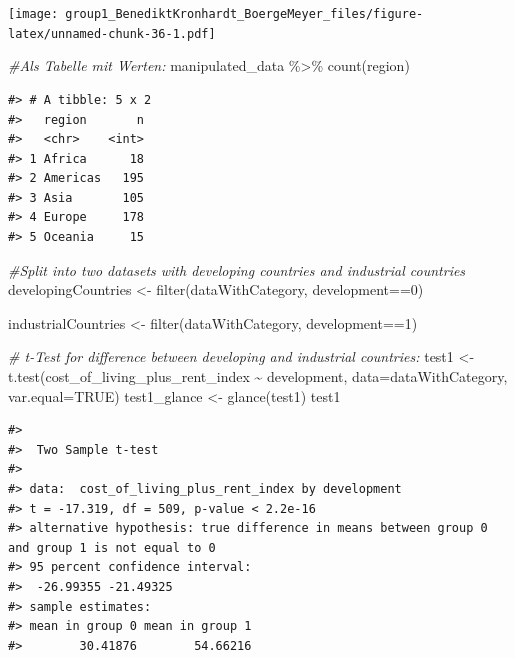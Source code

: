 \documentclass[
  11pt,
  a4paper,
  twoside]{scrbook}
\newenvironment{Shaded}{\begin{snugshade}}{\end{snugshade}}
\newcommand{\AttributeTok}[1]{\textcolor[rgb]{0.77,0.63,0.00}{#1}}
\newcommand{\CommentTok}[1]{\textcolor[rgb]{0.56,0.35,0.01}{\textit{#1}}}
\newcommand{\ConstantTok}[1]{\textcolor[rgb]{0.00,0.00,0.00}{#1}}
\newcommand{\DecValTok}[1]{\textcolor[rgb]{0.00,0.00,0.81}{#1}}
\newcommand{\FunctionTok}[1]{\textcolor[rgb]{0.00,0.00,0.00}{#1}}
\newcommand{\NormalTok}[1]{#1}
\newcommand{\OtherTok}[1]{\textcolor[rgb]{0.56,0.35,0.01}{#1}}
\newcommand{\SpecialCharTok}[1]{\textcolor[rgb]{0.00,0.00,0.00}{#1}}
\begin{document}
\linespread{1}\texttt{[image: group1\_BenediktKronhardt\_BoergeMeyer\_files/figure-latex/unnamed-chunk-36-1.pdf]} \linespread{1}

\begin{Shaded}
\begin{Highlighting}[]

\CommentTok{\#Als Tabelle mit Werten:}
\NormalTok{manipulated\_data }\SpecialCharTok{\%\textgreater{}\%} \FunctionTok{count}\NormalTok{(region)}
\end{Highlighting}
\end{Shaded}

\linespread{1}

\begin{verbatim}
#> # A tibble: 5 x 2
#>   region       n
#>   <chr>    <int>
#> 1 Africa      18
#> 2 Americas   195
#> 3 Asia       105
#> 4 Europe     178
#> 5 Oceania     15
\end{verbatim}

\linespread{1}

\begin{Shaded}
\begin{Highlighting}[]


\CommentTok{\#Split into two datasets with developing countries and industrial countries}
\NormalTok{developingCountries }\OtherTok{\textless{}{-}} \FunctionTok{filter}\NormalTok{(dataWithCategory, development}\SpecialCharTok{==}\DecValTok{0}\NormalTok{)}

\NormalTok{industrialCountries }\OtherTok{\textless{}{-}} \FunctionTok{filter}\NormalTok{(dataWithCategory, development}\SpecialCharTok{==}\DecValTok{1}\NormalTok{)}


\CommentTok{\# t{-}Test for difference between developing and industrial countries:}
\NormalTok{test1 }\OtherTok{\textless{}{-}} \FunctionTok{t.test}\NormalTok{(cost\_of\_living\_plus\_rent\_index }\SpecialCharTok{\textasciitilde{}}\NormalTok{ development, }\AttributeTok{data=}\NormalTok{dataWithCategory, }\AttributeTok{var.equal=}\ConstantTok{TRUE}\NormalTok{)}
\NormalTok{test1\_glance }\OtherTok{\textless{}{-}} \FunctionTok{glance}\NormalTok{(test1)}
\NormalTok{test1}
\end{Highlighting}
\end{Shaded}

\linespread{1}

\begin{verbatim}
#> 
#>  Two Sample t-test
#> 
#> data:  cost_of_living_plus_rent_index by development
#> t = -17.319, df = 509, p-value < 2.2e-16
#> alternative hypothesis: true difference in means between group 0 and group 1 is not equal to 0
#> 95 percent confidence interval:
#>  -26.99355 -21.49325
#> sample estimates:
#> mean in group 0 mean in group 1 
#>        30.41876        54.66216
\end{verbatim}
\end{document}
